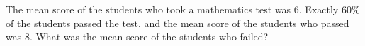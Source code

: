 The mean score of the students who took a mathematics test was $6$. Exactly $60\%$ of the students passed the test, and the mean score of the students who passed was $8$. What was the mean score of the students who failed?
